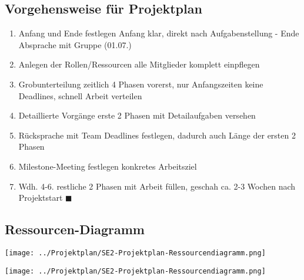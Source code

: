 \documentclass[ignorenonframetext, 11pt, table]{beamer}
\begin{document}
\subsection{Vorgehensweise für Projektplan}
\begin{frame}
	\begin{enumerate}
		\item<1-> Anfang und Ende festlegen
			 {Anfang klar, direkt nach Aufgabenstellung - Ende Absprache mit Gruppe (01.07.)}
		\item<2-> Anlegen der Rollen/Ressourcen
			 {alle Mitglieder komplett einpflegen}
		\item<3-> Grobunterteilung zeitlich
			 {4 Phasen vorerst, nur Anfangszeiten keine Deadlines, schnell Arbeit verteilen}
		\item<4-> Detaillierte Vorgänge
			 {erste 2 Phasen mit Detailaufgaben versehen}
		\item<5-> Rücksprache mit Team
			 {Deadlines festlegen, dadurch auch Länge der ersten 2 Phasen}
		\item<6-> Milestone-Meeting festlegen
			 {konkretes Arbeitsziel}
		\item<7-> Wdh. 4-6.
			 {restliche 2 Phasen mit Arbeit füllen, geschah ca. 2-3 Wochen nach Projektstart $\blacksquare$}
	\end{enumerate}
\end{frame}

\subsection{Ressourcen-Diagramm}
\begin{frame}
	\begin{flushleft}
	\texttt{[image: ../Projektplan/SE2-Projektplan-Ressourcendiagramm.png]}
	\end{flushleft}
	\begin{flushright}
	\texttt{[image: ../Projektplan/SE2-Projektplan-Ressourcendiagramm.png]}
	\end{flushright}
\end{frame}
\end{document}
